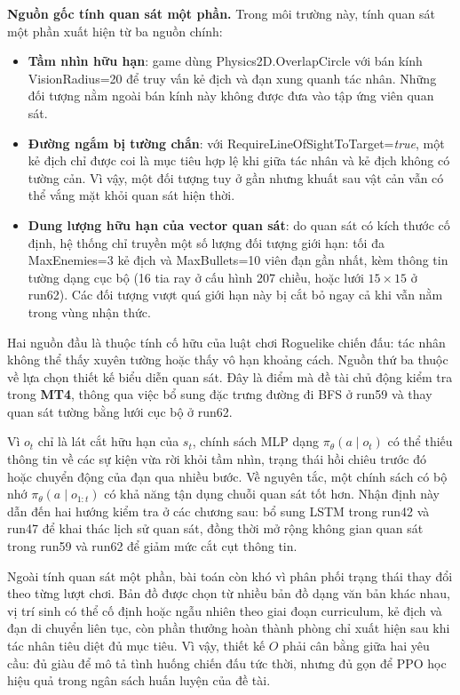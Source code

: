 \textbf{Nguồn gốc tính quan sát một phần.} Trong môi trường này, tính quan sát một phần xuất hiện từ ba nguồn chính:
\begin{itemize}
    \item \textbf{Tầm nhìn hữu hạn}: game dùng Physics2D.OverlapCircle với bán kính VisionRadius=20 để truy vấn kẻ địch và đạn xung quanh tác nhân. Những đối tượng nằm ngoài bán kính này không được đưa vào tập ứng viên quan sát.
    \item \textbf{Đường ngắm bị tường chắn}: với RequireLineOfSightToTarget=\textit{true}, một kẻ địch chỉ được coi là mục tiêu hợp lệ khi giữa tác nhân và kẻ địch không có tường cản. Vì vậy, một đối tượng tuy ở gần nhưng khuất sau vật cản vẫn có thể vắng mặt khỏi quan sát hiện thời.
    \item \textbf{Dung lượng hữu hạn của vector quan sát}: do quan sát có kích thước cố định, hệ thống chỉ truyền một số lượng đối tượng giới hạn: tối đa MaxEnemies=3 kẻ địch và MaxBullets=10 viên đạn gần nhất, kèm thông tin tường dạng cục bộ (16 tia ray ở cấu hình 207 chiều, hoặc lưới $15\times15$ ở run62). Các đối tượng vượt quá giới hạn này bị cắt bỏ ngay cả khi vẫn nằm trong vùng nhận thức.
\end{itemize}

Hai nguồn đầu là thuộc tính cố hữu của luật chơi Roguelike chiến đấu: tác nhân không thể thấy xuyên tường hoặc thấy vô hạn khoảng cách. Nguồn thứ ba thuộc về lựa chọn thiết kế biểu diễn quan sát. Đây là điểm mà đề tài chủ động kiểm tra trong \textbf{MT4}, thông qua việc bổ sung đặc trưng đường đi BFS ở run59 và thay quan sát tường bằng lưới cục bộ ở run62.

Vì $o_t$ chỉ là lát cắt hữu hạn của $s_t$, chính sách MLP dạng $\pi_\theta(a \mid o_t)$ có thể thiếu thông tin về các sự kiện vừa rời khỏi tầm nhìn, trạng thái hồi chiêu trước đó hoặc chuyển động của đạn qua nhiều bước. Về nguyên tắc, một chính sách có bộ nhớ $\pi_\theta(a \mid o_{1:t})$ có khả năng tận dụng chuỗi quan sát tốt hơn. Nhận định này dẫn đến hai hướng kiểm tra ở các chương sau: bổ sung LSTM trong run42 và run47 để khai thác lịch sử quan sát, đồng thời mở rộng không gian quan sát trong run59 và run62 để giảm mức cắt cụt thông tin.

Ngoài tính quan sát một phần, bài toán còn khó vì phân phối trạng thái thay đổi theo từng lượt chơi. Bản đồ được chọn từ nhiều bản đồ dạng văn bản khác nhau, vị trí sinh có thể cố định hoặc ngẫu nhiên theo giai đoạn curriculum, kẻ địch và đạn di chuyển liên tục, còn phần thưởng hoàn thành phòng chỉ xuất hiện sau khi tác nhân tiêu diệt đủ mục tiêu. Vì vậy, thiết kế $O$ phải cân bằng giữa hai yêu cầu: đủ giàu để mô tả tình huống chiến đấu tức thời, nhưng đủ gọn để PPO học hiệu quả trong ngân sách huấn luyện của đề tài.


